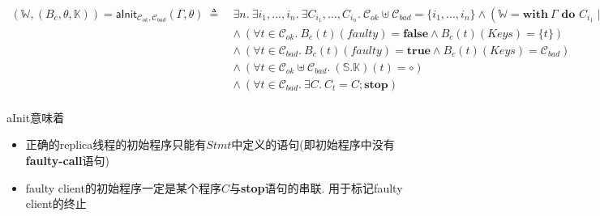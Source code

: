 \documentclass[UTF8, 8pt, a4paper ]{ctexart}
\newcommand{\clientSet}{\mathcal{C}_{\textit{ok}}}
\newcommand{\faultyClients}{\mathcal{C}_{\textit{bad}}}
\begin{document}
\begin{small}
\begin{center}
	
	
	\begin{definition}\ 
		
		
		$ \begin{array}{ll}
			(\mathbb{W}, (B_c, \theta, \mathbb{K})) = \textsf{aInit}_{\clientSet, \faultyClients}(\Gamma, \theta) \ \triangleq \ & \exists n. \ \exists i_1, ..., i_n. \ \exists {C}_{i_1}, ..., {C}_{i_n}.\ \clientSet \uplus \faultyClients  = \{ i_1, ..., i_n \} \land (\mathbb{W} = \textbf{with} \ \Gamma \textbf{ do } {C}_{i_1} \parallel ... \parallel {C}_{i_n})\\
			
			
			
			& \land \ (\forall t \in \clientSet.\ B_c(t)(\textit{faulty}) = \textbf{false} \land B_c(t)(\textit{Keys}) = \{t\} ) \\
			
			& \land \ (\forall t \in \faultyClients.\ B_c(t)(\textit{faulty}) = \textbf{true} \land B_c(t)(\textit{Keys}) = \faultyClients) \\
			
			& \land \ (\forall t \in \clientSet \uplus \faultyClients.\ (\mathbb{S}.\mathbb{K})(t) = \circ)  \\
			
			
			& {\land \ (\forall t \in \faultyClients.\ \exists {C}.\ {C}_t = C;\textbf{stop})}\\
			
		\end{array} $
	\end{definition}
	
	\textsf{aInit}意味着
	\begin{itemize}
		\item 正确的replica线程的初始程序只能有$ \textit{Stmt} $中定义的语句(即初始程序中没有\textbf{faulty-call}语句)
		
		\item faulty client的初始程序一定是某个程序$ C $与\textbf{stop}语句的串联. 用于标记faulty client的终止
		
		

\end{itemize}
\end{center}
\end{small}
\end{document}
